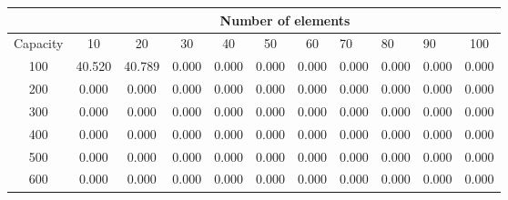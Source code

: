 \documentclass[11pt]{article}
\begin{document}
\begin{table}[h!]
\centering
\begin{tabular}{c|cccccccccc|}
\cline{2-11}
& \multicolumn{10}{c|}{Number of elements}\\ \hline
\multicolumn{1}{|c|}{Capacity} & \multicolumn{1}{c|}{10} & \multicolumn{1}{c|}{20} & \multicolumn{1}{c|}{30} & \multicolumn{1}{c|}{40} & \multicolumn{1}{c|}{50} & \multicolumn{1}{c|}{60} & \multicolumn{1}{l|}{70} & \multicolumn{1}{l|}{80} & \multicolumn{1}{l|}{90} & 100 \\ \hline
\multicolumn{1}{|c|}{100} & \multicolumn{1}{c|}{40.520} & \multicolumn{1}{c|}{40.789} & \multicolumn{1}{c|}{0.000} & \multicolumn{1}{c|}{0.000} & \multicolumn{1}{c|}{0.000} & \multicolumn{1}{c|}{0.000} & \multicolumn{1}{c|}{0.000} & \multicolumn{1}{c|}{0.000} & \multicolumn{1}{c|}{0.000}  & 0.000 \\ \hline
\multicolumn{1}{|c|}{200} & \multicolumn{1}{c|}{0.000} & \multicolumn{1}{c|}{0.000} & \multicolumn{1}{c|}{0.000} & \multicolumn{1}{c|}{0.000} & \multicolumn{1}{c|}{0.000} & \multicolumn{1}{c|}{0.000} & \multicolumn{1}{c|}{0.000} & \multicolumn{1}{c|}{0.000} & \multicolumn{1}{c|}{0.000}  & 0.000 \\ \hline
\multicolumn{1}{|c|}{300} & \multicolumn{1}{c|}{0.000} & \multicolumn{1}{c|}{0.000} & \multicolumn{1}{c|}{0.000} & \multicolumn{1}{c|}{0.000} & \multicolumn{1}{c|}{0.000} & \multicolumn{1}{c|}{0.000} & \multicolumn{1}{c|}{0.000} & \multicolumn{1}{c|}{0.000} & \multicolumn{1}{c|}{0.000}  & 0.000 \\ \hline
\multicolumn{1}{|c|}{400} & \multicolumn{1}{c|}{0.000} & \multicolumn{1}{c|}{0.000} & \multicolumn{1}{c|}{0.000} & \multicolumn{1}{c|}{0.000} & \multicolumn{1}{c|}{0.000} & \multicolumn{1}{c|}{0.000} & \multicolumn{1}{c|}{0.000} & \multicolumn{1}{c|}{0.000} & \multicolumn{1}{c|}{0.000}  & 0.000 \\ \hline
\multicolumn{1}{|c|}{500} & \multicolumn{1}{c|}{0.000} & \multicolumn{1}{c|}{0.000} & \multicolumn{1}{c|}{0.000} & \multicolumn{1}{c|}{0.000} & \multicolumn{1}{c|}{0.000} & \multicolumn{1}{c|}{0.000} & \multicolumn{1}{c|}{0.000} & \multicolumn{1}{c|}{0.000} & \multicolumn{1}{c|}{0.000}  & 0.000 \\ \hline
\multicolumn{1}{|c|}{600} & \multicolumn{1}{c|}{0.000} & \multicolumn{1}{c|}{0.000} & \multicolumn{1}{c|}{0.000} & \multicolumn{1}{c|}{0.000} & \multicolumn{1}{c|}{0.000} & \multicolumn{1}{c|}{0.000} & \multicolumn{1}{c|}{0.000} & \multicolumn{1}{c|}{0.000} & \multicolumn{1}{c|}{0.000}  & 0.000 \\ \hline

\end{tabular}
\end{table}
\end{document}
